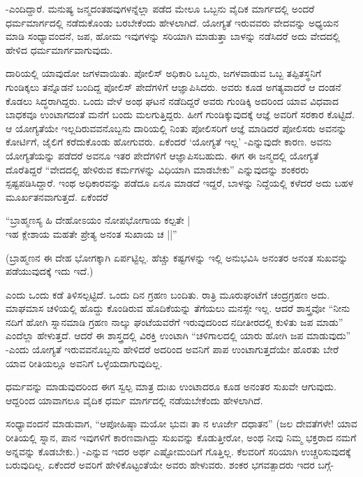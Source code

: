 -ಎಂದಿದ್ದಾರೆ. ಮನುಷ್ಯ ಜನ್ಮದಂತಹವುಗಳನ್ನೆಲ್ಲಾ ಪಡೆದ ಮೇಲೂ ಒಬ್ಬನು ವೈದಿಕ ಮಾರ್ಗದಲ್ಲಿ ಅಂದರೆ ಧರ್ಮಮಾರ್ಗದಲ್ಲಿ ನಡೆದುಕೊಂಡು ಬರಬೇಕೆಂದು ಹೇಳಲಾಗಿದೆ. ಯೋಗ್ಯತೆ ಇರುವವರು ವೇದವನ್ನು ಅಧ್ಯಯನ ಮಾಡಿ ಸಂಧ್ಯಾವಂದನೆ, ಜಪ, ಹೋಮ ಇವುಗಳನ್ನು ಸರಿಯಾಗಿ ಮಾಡುತ್ತಾ ಬಾಳನ್ನು ನಡೆಸಿದರೆ ಅದು ವೇದದಲ್ಲಿ ಹೇಳಿದ ಧರ್ಮಮಾರ್ಗವಾಗುವುದು.

ದಾರಿಯಲ್ಲಿ ಯಾವುದೋ ಜಗಳವಾಯಿತು. ಪೋಲಿಸ್ ಅಧಿಕಾರಿ ಒಬ್ಬರು, ಜಗಳವಾಡುವ ಒಬ್ಬ ತಪ್ಪಿತಸ್ಥನಿಗೆ ಗುಂಡಿಕ್ಕಲು ತನ್ನೊಡನೆ ಬಂದಿದ್ದ ಪೋಲಿಸ್ ಪೇದೆಗಳಿಗೆ ಆಜ್ಞಾಪಿಸಿದರು. ಅವರು ಕೂಡ ಅಗತ್ಯವಾದರೆ ಆ ದಂಡನೆ ಕೊಡಲು ಸಿದ್ಧರಾಗಿದ್ದರು. ಒಂದು ವೇಳೆ ಅಂಥ ಘಟನೆ ನಡೆದಿದ್ದರೆ ಅವರು ಗುಂಡಿಕ್ಕಿ ಅದರಿಂದ ಯಾವ ವಿಧವಾದ ಬಾಧಕವೂ ಉಂಟಾಗದಂತೆ ಮನೆಗೆ ಬಂದು ಮಲಗುತ್ತಿದ್ದರು. ಹೀಗೆ ಗುಂಡಿಕ್ಕುವುದಕ್ಕೆ ಆಜ್ಞೆ ಅವರಿಗೆ ಸರಕಾರ ಕೊಟ್ಟಿದೆ. ಆ ಯೋಗ್ಯತೆಯೇ ಇಲ್ಲದಿರುವವನೊಬ್ಬನು ದಾರಿಯಲ್ಲಿ ನಿಂತು ಪೋಲಿಸರಿಗೆ ಆಜ್ಞೆ ಮಾಡಿದರೆ ಪೋಲಿಸರು ಅವನನ್ನು ಕೋರ್ಟಿಗೆ, ಜೈಲಿಗೆ ಕರೆದುಕೊಂಡು ಹೋಗುವರು. ಏಕೆಂದರೆ `ಯೋಗ್ಯತೆ ಇಲ್ಲ' -ಎನ್ನುವುದೇ ಕಾರಣ. ಅವನು ಯೋಗ್ಯತೆಯನ್ನು ಪಡೆದರೆ ಅವನೂ ಇತರ ಪೇದೆಗಳಿಗೆ ಆಜ್ಞಾಪಿಸಬಹುದು. ಈಗ ಈ ಜನ್ಮದಲ್ಲಿ ಯೋಗ್ಯತೆ ದೊರೆತಿದ್ದರೆ ``ವೇದದಲ್ಲಿ ಹೇಳಿರುವ ಕರ್ಮಗಳನ್ನು ವಿಧಿಯಾಗಿ ಮಾಡಬೇಕು'' ಎನ್ನುವುದನ್ನು ಶಂಕರರು ಸ್ಪಷ್ಟಪಡಿಸಿದ್ದಾರೆ. ಇಂಥ ಅಧಿಕಾರವನ್ನು ಪಡೆದೂ ಏನೂ ಮಾಡದೆ ಇದ್ದರೆ, ಬಾಳನ್ನು ನಿದ್ದೆಯಲ್ಲಿ ಕಳೆದರೆ ಅದು ಬಹಳ ಮೂರ್ಖತನವಾಗುತ್ತದೆ. ಏಕೆಂದರೆ

\begin{shloka}
``ಬ್ರಾಹ್ಮಣಸ್ಯ ಹಿ ದೇಹೋಽಯಂ ನೋಪಭೋಗಾಯ ಕಲ್ಪತೇ |\\
ಇಹ ಕ್ಲೇಶಾಯ ಮಹತೇ ಪ್ರೇತ್ಯ ಅನಂತ ಸುಖಾಯ ಚ ||''
\end{shloka}

(ಬ್ರಾಹ್ಮಣನ ಈ ದೇಹ ಭೋಗಕ್ಕಾಗಿ ಏರ್ಪಟ್ಟಿಲ್ಲ. ಹೆಚ್ಚು ಕಷ್ಟಗಳನ್ನು ಇಲ್ಲಿ ಅನುಭವಿಸಿ ಅನಂತರ ಅನಂತ ಸುಖವನ್ನು ಪಡೆಯುವುದಕ್ಕೆ ಇದು ಇದೆ.)

ಎಂದು ಒಂದು ಕಡೆ ತಿಳಿಸಲ್ಪಟ್ಟಿದೆ. ಒಂದು ದಿನ ಗ್ರಹಣ ಬಂದಿತು. ರಾತ್ರಿ ಮೂರುಘಂಟೆಗೆ ಚಂದ್ರಗ್ರಹಣ ಅದು. ಮಾಘಮಾಸ ಚಳಿಯಲ್ಲಿ ಹೊದ್ದು ಕೊಂಡಿರುವ ಹೊದಿಕೆಯನ್ನು ತೆಗೆಯಲು ಮನಸ್ಸೇ ಇಲ್ಲ. ಆದರೆ ಶಾಸ್ತ್ರವೋ ``ನೀನು ನದಿಗೆ ಹೋಗಿ ಸ್ನಾನಮಾಡಿ ಗ್ರಹಣ ನಾಲ್ಕು ಘಂಟೆಯವರೆಗೆ ಇರುವುದರಿಂದ ನದೀತೀರದಲ್ಲಿ ಕುಳಿತು ಜಪ ಮಾಡು'' ಎಂದೆಲ್ಲಾ ಹೇಳುತ್ತದೆ. ಆದರೆ ಈ ಶಾಸ್ತ್ರದಲ್ಲಿ ವಿರಕ್ತಿ ಉಂಟಾಗಿ ``ಚಳಿಗಾಲದಲ್ಲಿ ಯಾರು ಹೋಗಿ ಜಪ ಮಾಡುವುದು'' -ಎಂದು ಯೋಗ್ಯತೆ ಇರುವವನೊಬ್ಬನು ಹೇಳಿದರೆ ಅದರಿಂದ ಅವನಿಗೆ ಪಾಪ ಉಂಟಾಗುತ್ತದೆಯೇ ಹೊರತು ಬೇರೆ ಯಾವ ರೀತಿಯಲ್ಲೂ ಅವನಿಗೆ ಒಳ್ಳೆಯದಾಗುವುದಿಲ್ಲ.

ಧರ್ಮವನ್ನು ಮಾಡುವುದರಿಂದ ಈಗ ಸ್ವಲ್ಪ ಮಾತ್ರ ದುಃಖ ಉಂಟಾದರೂ ಕೂಡ ಅನಂತರ ಸುಖವೇ ಆಗುವುದು. ಆದ್ದರಿಂದ ಯಾವಾಗಲೂ ವೈದಿಕ ಧರ್ಮ ಮಾರ್ಗದಲ್ಲಿ ನಡೆಯಬೇಕೆಂದು ಹೇಳಲಾಗಿದೆ.

ಸಂಧ್ಯಾವಂದನೆ ಮಾಡುವಾಗ, ``ಆಪೋಹಿಷ್ಠಾ ಮಯೋ ಭುವಃ ತಾ ನ ಊರ್ಜೇ ದಧಾತನ'' (ಜಲ ದೇವತೆಗಳೇ! ಯಾವ ರೀತಿಯಲ್ಲಿ ಸ್ನಾನ, ಪಾನ ಇವುಗಳಿಗೆ ಕಾರಣವಾಗಿದ್ದು ಸುಖವನ್ನು ಕೊಡುತ್ತೀರೋ, ಅಂಥ ನೀವು ನಿಮ್ಮ ಭಕ್ತರಾದ ನಮಗೆ ಅನ್ನವನ್ನು ಕೊಡಬೇಕು.) -ಎನ್ನುವ ಇದರ ಅರ್ಥ ಎಷ್ಟೋಮಂದಿಗೆ ಗೊತ್ತಿಲ್ಲ. ಕೆಲವರಿಗೆ ಸರಿಯಾಗಿ ಉಚ್ಚರಿಸುವುದಕ್ಕೆ ಬರುವುದಿಲ್ಲ. ಏಕೆಂದರೆ ಅವರಿಗೆ ಹೇಳಿಕೊಟ್ಟಂತೆಯೇ ಅವರು ಹೇಳುವರು. ಶಂಕರ ಭಗವತ್ಪಾದರು ಇದರ ಬಗ್ಗೆ-

